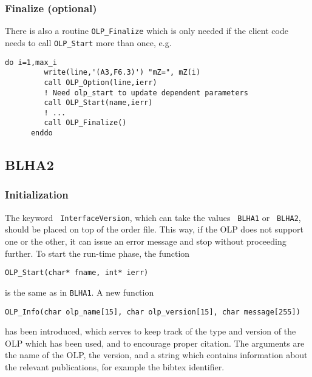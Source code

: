 \subsubsection{Finalize (optional)}
There is also a routine \texttt{OLP\_Finalize} which is only needed
if the client code needs to call \texttt{OLP\_Start} more than once, e.g.
\begin{lstlisting}[style=fortran]
      do i=1,max_i
         write(line,'(A3,F6.3)') "mZ=", mZ(i)
         call OLP_Option(line,ierr)
         ! Need olp_start to update dependent parameters
         call OLP_Start(name,ierr)
         ! ...
         call OLP_Finalize()
      enddo
\end{lstlisting}

\subsection{BLHA2}


\subsubsection{Initialization}
The keyword \texttt{ InterfaceVersion}, which can take the values
\texttt{ BLHA1} or \texttt{ BLHA2}, should be placed on top of the order file. 
This way, if the OLP does not support one or the other, it can issue an error message and stop 
without proceeding further.
To start the run-time phase, the function
\begin{lstlisting}[style=C]
      OLP_Start(char* fname, int* ierr)
\end{lstlisting}
is the same  as in \texttt{BLHA1}.
A new function
\begin{lstlisting}[style=C]
      OLP_Info(char olp_name[15], char olp_version[15], char message[255])
\end{lstlisting}
has been introduced,
which serves to keep track of the type and version of the OLP which has been used,
and to encourage proper citation. 
The arguments are the name of the OLP, the version, and a string which  
contains information about
the relevant publications, for example the bibtex identifier.

